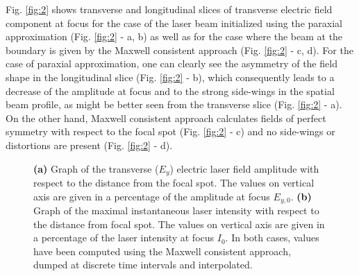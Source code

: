 Fig. \ref{fig:2} shows transverse and longitudinal slices of transverse electric field component at focus for the case of the laser beam initialized using the paraxial approximation (Fig. \ref{fig:2} - a, b) as well as for the case where the beam at the boundary is given by the Maxwell consistent approach (Fig. \ref{fig:2} - c, d). For the case of paraxial approximation, one can clearly see the asymmetry of the field shape in the longitudinal slice (Fig. \ref{fig:2} - b), which consequently leads to a decrease of the amplitude at focus and to the strong side-wings in the spatial beam profile, as might be better seen from the transverse slice (Fig. \ref{fig:2} - a). On the other hand, Maxwell consistent approach calculates fields of perfect symmetry with respect to the focal spot (Fig. \ref{fig:2} - c) and no side-wings or distortions are present (Fig. \ref{fig:2} - d).

\begin{figure}[h!]
	\centering
	\hspace{2mm}
	\caption{\textbf{(a)} Graph of the transverse ($ E_{y} $) electric laser field amplitude with respect to the distance from the focal spot. The values on vertical axis are given in a percentage of the amplitude at focus $ E_{y, 0} $. \textbf{(b)} Graph of the maximal instantaneous laser intensity with respect to the distance from focal spot. The values on vertical axis are given in a percentage of the laser intensity at focus $ I_{0} $. In both cases, values have been computed using the Maxwell consistent approach, dumped at discrete time intervals and interpolated.}
	\label{fig:8}
\end{figure}

